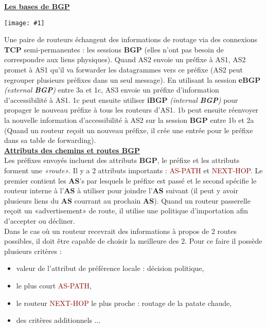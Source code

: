 \documentclass{article}
\newcommand{\red}[1]{\textcolor{darkred}{#1}}
\newcommand{\imgR}[2]{\begin{center}\texttt{[image: \#1]}\end{center}}
\begin{document}
\textbf{\underline{Les bases de BGP}} \\

\imgR{CN_095.png}{250}

Une paire de routeurs échangent des informations de routage via des connexions \textbf{TCP} semi-permanentes : 
les sessions \textbf{BGP} (elles n'ont pas besoin de correspondre aux liens physiques). Quand AS2 envoie un 
préfixe à AS1, AS2 promet à AS1 qu'il va forwarder les datagrammes vers ce préfixe (AS2 peut regrouper plusieurs
préfixes dans un seul message). En utilisant la session \textbf{eBGP} \textit{(external \textbf{BGP})} entre 3a 
et 1c, AS3 envoie un préfixe d'information d'accessibilité à AS1. 1c peut ensuite utiliser \textbf{iBGP} 
\textit{(internal \textbf{BGP})} pour propager le nouveau préfixe à tous les routeurs d'AS1. 1b peut ensuite 
réenvoyer la nouvelle information d'accessibilité à AS2 sur la session \textbf{BGP} entre 1b et 2a (Quand un 
routeur reçoit un nouveau préfixe, il crée une entrée pour le préfixe dans sa table de forwarding). \\
\newpage
\textbf{\underline{Attributs des chemins et routes BGP}} \\

Les préfixes envoyés incluent des attributs \textbf{BGP}, le préfixe et les attributs forment une
\textit{«route»}. Il y a 2 attributs importants : \red{AS-PATH} et \red{NEXT-HOP}. Le premier contient les 
\textbf{AS}'s par lesquels le préfixe est passé et le second spécifie le routeur interne à l'\textbf{AS} à 
utiliser pour joindre l'\textbf{AS} suivant (il peut y avoir plusieurs liens du \textbf{AS} courrant au prochain 
\textbf{AS}). Quand un routeur passerelle reçoit un «advertisement» de route, il utilise une politique 
d'importation afin d'accepter ou décliner. \\
Dans le cas où un routeur recevrait des informations à propos de 2 routes possibles, il doit être capable de 
choisir la meilleure des 2. Pour ce faire il possède plusieurs critères : 
\begin{itemize}
\item valeur de l'attribut de préférence locale : décision politique,
\item le plus court \red{AS-PATH},
\item le routeur \red{NEXT-HOP} le plus proche : routage de la patate chaude,
\item des critères additionnels ... \\
\end{itemize}
\end{document}
